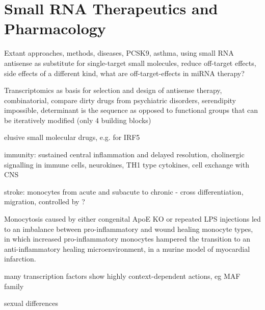 \section{Small RNA Therapeutics and Pharmacology} \label{sec:discussion:therapy}
Extant approaches, methods, diseases, PCSK9, asthma, using small RNA antisense as substitute for single-target small molecules, reduce off-target effects, side effects of a different kind, what are off-target-effects in miRNA therapy?

Transcriptomics as basis for selection and design of antisense therapy, combinatorial, compare dirty drugs from psychiatric disorders, serendipity impossible, determinant is the sequence as opposed to functional groups that can be iteratively modified (only 4 building blocks)

elusive small molecular drugs, e.g. for IRF5 \cite{Almuttaqi2019}

immunity: sustained central inflammation and delayed resolution, cholinergic signalling in immune cells, neurokines, TH1 type cytokines, cell exchange with CNS

stroke: monocytes from acute and subacute to chronic - cross differentiation, migration, controlled by ?

Monocytosis caused by either congenital ApoE KO or repeated LPS injections led to an imbalance between pro-inflammatory and wound healing monocyte types, in which increased pro-inflammatory monocytes hampered the transition to an anti-inflammatory healing microenvironment, in a murine model of myocardial infarction.\cite{Panizzi2010}

many transcription factors show highly context-dependent actions, eg MAF family \cite{Hamada2020}

sexual differences